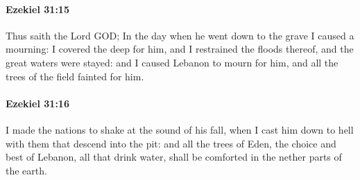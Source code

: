 		\paragraph{Ezekiel 31:15} %
			\label{EZEKIEL-31-15}

			Thus saith the Lord GOD; In the day when he went down to the grave I caused a mourning: I covered the deep for him, and I restrained the floods thereof, and the great waters were stayed: and I caused Lebanon to mourn for him, and all the trees of the field fainted for him.


		\paragraph{Ezekiel 31:16} %
			\label{EZEKIEL-31-16}

			I made the nations to shake at the sound of his fall, when I cast him down to hell with them that descend into the pit: and all the trees of Eden, the choice and best of Lebanon, all that drink water, shall be comforted in the nether parts of the earth.

